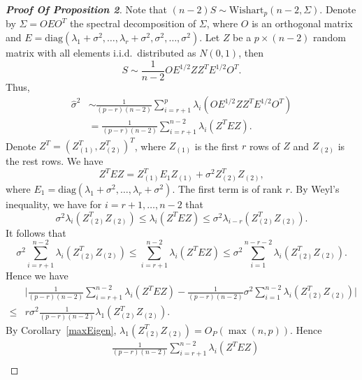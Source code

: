 
\begin{proof}[\textbf{Proof Of Proposition 2}]
    Note that $(n-2)S\sim \mathrm{Wishart}_p (n-2,\Sigma)$.
    Denote by $\Sigma=OEO^T$ the spectral decomposition of $\Sigma$, where $O$ is an orthogonal matrix and $E=\mathrm{diag}(\lambda_1+\sigma^2,\ldots,\lambda_r+\sigma^2,\sigma^2,\ldots,\sigma^2)$.
    Let $Z$ be a $p\times (n-2)$ random matrix with all elements i.i.d.\ distributed as $N(0,1)$, then
    $$
        S\sim \frac{1}{n-2} O E^{1/2} Z Z^T E^{1/2} O^T.
    $$
    Thus,
    \begin{equation*}
        \begin{aligned}
            \hat{\sigma}^2&\sim
            \frac{1}{(p-r)(n-2)}\sum_{i=r+1}^p \lambda_i (O E^{1/2} Z Z^T E^{1/2} O^T)\\
            &=
            \frac{1}{(p-r)(n-2)}\sum_{i=r+1}^{n-2} \lambda_i ( Z^T E Z).
        \end{aligned}
    \end{equation*}
    Denote $Z^T={(Z_{(1)}^T,Z_{(2)}^T)}^T$, where $Z_{(1)}$ is the first $r$ rows of $Z$ and $Z_{(2)}$ is the rest rows. We have
    $$
    Z^T E Z =Z_{(1)}^T E_1 Z_{(1)}+\sigma^2 Z_{(2)}^T Z_{(2)},
    $$
    where $E_1=\mathrm{diag}(\lambda_1+\sigma^2,\ldots,\lambda_r +\sigma^2)$. The first term is of rank $r$. By Weyl's inequality, we have for $i=r+1,\ldots, n-2$ that
    $$
    \sigma^2\lambda_i(Z_{(2)}^T Z_{(2)}) \leq \lambda_i(Z^T E Z)\leq
    \sigma^2\lambda_{i-r}(Z_{(2)}^T Z_{(2)}).
    $$
    It follows that
    $$
    \sigma^2\sum_{i=r+1}^{n-2}\lambda_i(Z_{(2)}^T Z_{(2)}) \leq \sum_{i=r+1}^{n-2}\lambda_i(Z^T E Z)\leq
    \sigma^2\sum_{i=1}^{n-r-2}\lambda_{i}(Z_{(2)}^T Z_{(2)}).
    $$
    Hence we have
     \begin{equation*}
         \begin{aligned}
             &\Big|\frac{1}{(p-r)(n-2)}\sum_{i=r+1}^{n-2}\lambda_i(Z^T E Z)-
    \frac{1}{(p-r)(n-2)} \sigma^2\sum_{i=1}^{n-2}\lambda_{i}(Z_{(2)}^T Z_{(2)})\Big|
             \\
             \leq & r\sigma^2\frac{1}{(p-r)(n-2)} \lambda_1 (Z_{(2)}^T Z_{(2)}).
         \end{aligned}
     \end{equation*}
    By Corollary~\ref{maxEigen}, $\lambda_1 (Z_{(2)}^T Z_{(2)})=O_P(\max(n,p))$. Hence
     \begin{equation*}
         \begin{aligned}
             &\frac{1}{(p-r)(n-2)}\sum_{i=r+1}^{n-2}\lambda_i(Z^T E Z)\\

\end{aligned}
\end{equation*}
\end{proof}
